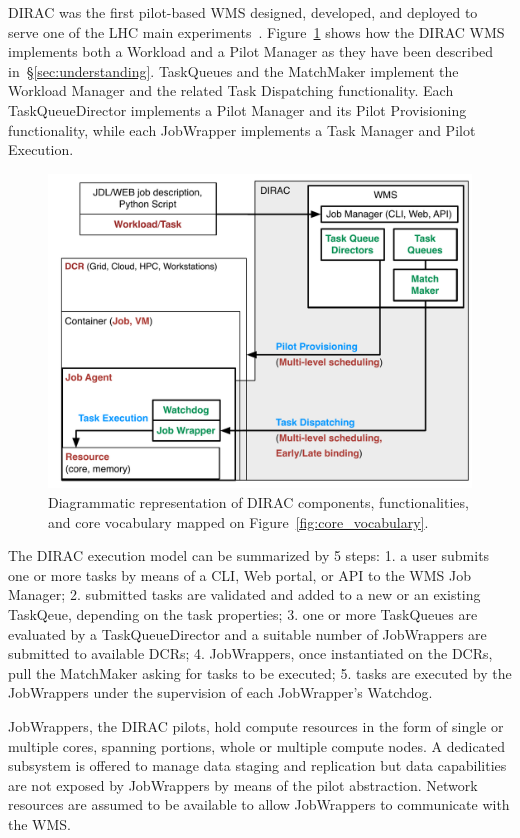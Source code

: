 \documentclass{sig-alternate}
\begin{document}
DIRAC was the first pilot-based WMS designed, developed, and deployed to serve
one of the LHC main experiments~\cite{}. Figure~\ref{fig:dirac_comparison} shows
how the DIRAC WMS implements both a Workload and a Pilot Manager as they have
been described in~\S\ref{sec:understanding}. TaskQueues and the MatchMaker
implement the Workload Manager and the related Task Dispatching functionality.
Each TaskQueueDirector implements a Pilot Manager and its Pilot Provisioning
functionality, while each JobWrapper implements a Task Manager and Pilot
Execution.

\begin{figure}[t]
    \centering
        \includegraphics[width=.48\textwidth]{figures/dirac_comparison.pdf}
    \caption{Diagrammatic representation of DIRAC components, functionalities,
    and core vocabulary mapped on Figure~\ref{fig:core_vocabulary}.}
    \label{fig:dirac_comparison}
\end{figure}

The DIRAC execution model can be summarized by 5 steps: 1. a user submits one or
more tasks by means of a CLI, Web portal, or API to the WMS Job Manager; 2.
submitted tasks are validated and added to a new or an existing TaskQeue,
depending on the task properties; 3. one or more TaskQueues are evaluated by a
TaskQueueDirector and a suitable number of JobWrappers are submitted to
available DCRs; 4. JobWrappers, once instantiated on the DCRs, pull the
MatchMaker asking for tasks to be executed; 5. tasks are executed by the
JobWrappers under the supervision of each JobWrapper's Watchdog.


JobWrappers, the DIRAC pilots, hold compute resources in the form of single or
multiple cores, spanning portions, whole or multiple compute nodes. A dedicated
subsystem is offered to manage data staging and replication but data
capabilities are not exposed by JobWrappers by means of the pilot abstraction.
Network resources are assumed to be available to allow JobWrappers to
communicate with the WMS.
\end{document}
